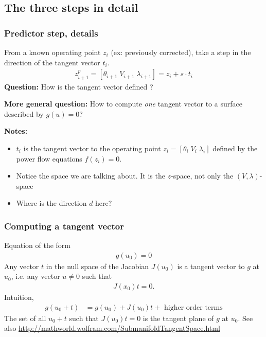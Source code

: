 \documentclass{beamer}
\begin{document}
\subsection{The three steps in detail}

\begin{frame}
  \frametitle{Predictor step, details}
  From a known operating point $z_i$ (ex: previously corrected), take a step in the direction of the tangent vector $t_{i}$.
  \begin{align}
  z_{i+1}^p = [\theta_{i+1} \; V_{i+1} \; \lambda_{i+1} ]= z_{i} + s \cdot t_{i}  
  \end{align}
\textbf{Question:} How is the tangent vector defined ?

\textbf{More general question:} How to compute \emph{one} tangent vector to a surface described by $g(u) = 0$?

\textbf{Notes:}
\begin{itemize}
\item $t_{i}$ is the tangent vector to the operating point $z_i = [\theta_i \; V_i \; \lambda_i]$ defined by the power flow equations $f(z_i) = 0$. 
\item Notice the space we are talking about. It is the $z$-space, not only the $(V,\lambda)$-space
\item Where is the direction $d$ here?
\end{itemize}
\end{frame}

\begin{frame}
  \frametitle{Computing a tangent vector}
  Equation of the form 
  \begin{align}
    \label{eq:4}
    g(u_0) = 0
  \end{align}
Any vector $t$ in the null space of the Jacobian $J(u_0)$ is a tangent vector to $g$ at $u_0$, i.e. any vector $u\neq 0$ such that
\begin{align}
  \label{eq:5}
  J(x_0) t = 0.
\end{align}
Intuition,
\begin{align}
  \label{eq:6}
  g(u_0+t) &= g(u_0) + J(u_0) t + \text{ higher order terms}
\end{align}
The set of all $u_0+t$ such that $J(u_0) t = 0$ is the tangent plane of $g$ at $u_0$.
\vskip0.5cm
\footnotesize See also \url{http://mathworld.wolfram.com/SubmanifoldTangentSpace.html}
\end{frame}
\end{document}
